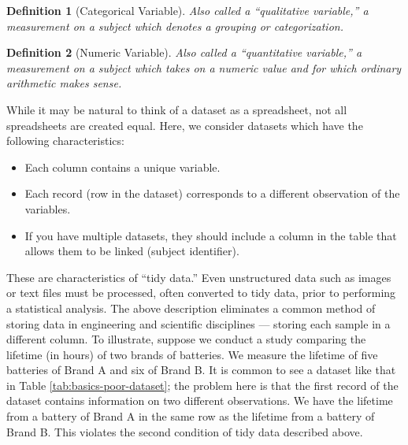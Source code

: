 \documentclass[
]{book}
\providecommand{\tightlist}{%
  \setlength{\itemsep}{0pt}\setlength{\parskip}{0pt}}
\theoremstyle{plain}
\theoremstyle{mydefn}
\newtheorem{definition}{Definition}[chapter]
\theoremstyle{myexmpl}
\theoremstyle{remark}
\begin{document}
\begin{definition}[Categorical Variable]
\protect\hypertarget{def:defn-categorical}{}{\label{def:defn-categorical} {} }Also called a ``qualitative variable,'' a measurement on a subject which denotes a grouping or categorization.
\end{definition}

\begin{definition}[Numeric Variable]
\protect\hypertarget{def:defn-numeric}{}{\label{def:defn-numeric} {} }Also called a ``quantitative variable,'' a measurement on a subject which takes on a numeric value \emph{and} for which ordinary arithmetic makes sense.
\end{definition}

While it may be natural to think of a dataset as a spreadsheet, not all spreadsheets are created equal. Here, we consider datasets which have the following characteristics:

\begin{itemize}
\tightlist
\item
  Each column contains a unique variable.
\item
  Each record (row in the dataset) corresponds to a different observation of the variables.
\item
  If you have multiple datasets, they should include a column in the table that allows them to be linked (subject identifier).
\end{itemize}

These are characteristics of ``tidy data.'' Even unstructured data such as images or text files must be processed, often converted to tidy data, prior to performing a statistical analysis. The above description eliminates a common method of storing data in engineering and scientific disciplines --- storing each sample in a different column. To illustrate, suppose we conduct a study comparing the lifetime (in hours) of two brands of batteries. We measure the lifetime of five batteries of Brand A and six of Brand B. It is common to see a dataset like that in Table \ref{tab:basics-poor-dataset}; the problem here is that the first record of the dataset contains information on two different observations. We have the lifetime from a battery of Brand A in the same row as the lifetime from a battery of Brand B. This violates the second condition of tidy data described above.
\end{document}
